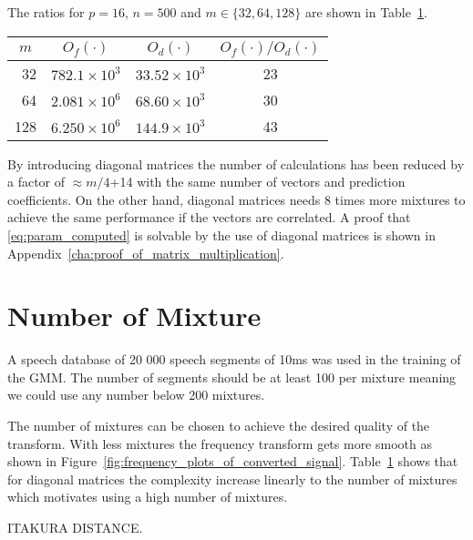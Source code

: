 The ratios for $p=16$, $n=500$ and $m\in \{32,64,128\}$ are shown in Table~\ref{tab:derivation_complexity}. 
\begin{table}[ht]
	\begin{center}
		\begin{tabular}{rrrc}
			\toprule
			\multicolumn{1}{c}{$m$} & \multicolumn{1}{c}{$O_f(\cdot)$} & \multicolumn{1}{c}{$O_d(\cdot)$} & \multicolumn{1}{c}{$O_f(\cdot)/O_d(\cdot)$} \\
			\midrule
			32 & $782.1 \times 10^3$ & $33.52 \times 10^3$ & 23  \\
			64 & $2.081 \times 10^6$ & $68.60 \times 10^3$ & 30  \\
			128 & $6.250 \times 10^6$ & $144.9 \times 10^3$ & 43  \\
			\bottomrule			
		\end{tabular}		
	\end{center}
\label{tab:derivation_complexity}	
\end{table}

By introducing diagonal matrices the number of calculations has been reduced by a factor of $\approx m/4$+14 with the same number of vectors and prediction coefficients. On the other hand, diagonal matrices needs 8 times more mixtures to achieve the same performance \cite{stylianou98} if the vectors are correlated. A proof that \eqref{eq:param_computed} is solvable by the use of diagonal matrices is shown in Appendix~\ref{cha:proof_of_matrix_multiplication}. 



\section{Number of Mixture} %
\label{sec:number_of_mixture}
A speech database of 20 000 speech segments of 10ms was used in the training of the GMM. The number of segments should be at least 100 per mixture meaning we could use any number below 200 mixtures.

The number of mixtures can be chosen to achieve the desired quality of the transform. With less mixtures the frequency transform gets more smooth as shown in Figure~\ref{fig:frequency_plots_of_converted_signal}. Table~\ref{tab:derivation_complexity} shows that for diagonal matrices the complexity increase linearly to the number of mixtures which motivates using a high number of mixtures.

ITAKURA DISTANCE.

